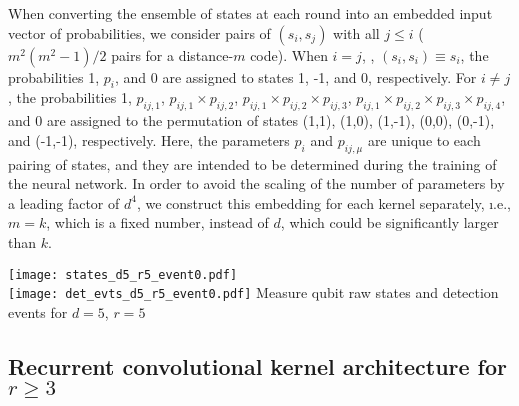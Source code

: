 When converting the ensemble of states at each round into an embedded input vector of probabilities, we consider pairs of $(s_i, s_j)$ with all $j\leq i$ ($m^2(m^2-1)/2$ pairs for a distance-$m$ code). When $i=j$, \ie, $(s_i, s_i)\equiv s_i$, the probabilities 1, $p_i$, and 0 are assigned to states 1, -1, and 0, respectively. For $i \neq j$, the probabilities 1, $p_{ij,1}$, $p_{ij,1} \times p_{ij,2}$, $p_{ij,1} \times p_{ij,2} \times p_{ij,3}$, $p_{ij,1} \times p_{ij,2} \times p_{ij,3} \times p_{ij,4}$, and 0 are assigned to the permutation of states (1,1), (1,0), (1,-1), (0,0), (0,-1), and (-1,-1), respectively. Here, the parameters $p_i$ and $p_{ij,\mu}$ are unique to each pairing of states, and they are intended to be determined during the training of the neural network. In order to avoid the scaling of the number of parameters by a leading factor of $d^4$, we construct this embedding for each kernel separately, \i.e., $m=k$, which is a fixed number, instead of $d$, which could be significantly larger than $k$.




\begin{figure*}[htb]
\centering
\texttt{[image: states\_d5\_r5\_event0.pdf]} \\
\texttt{[image: det\_evts\_d5\_r5\_event0.pdf]}
\ccaption
{Measure qubit raw states and detection events for $d=5$, $r=5$}
{
}
\label{fig:d5r5states}
\end{figure*}



\subsection{Recurrent convolutional kernel architecture for $r\geq 3$}
